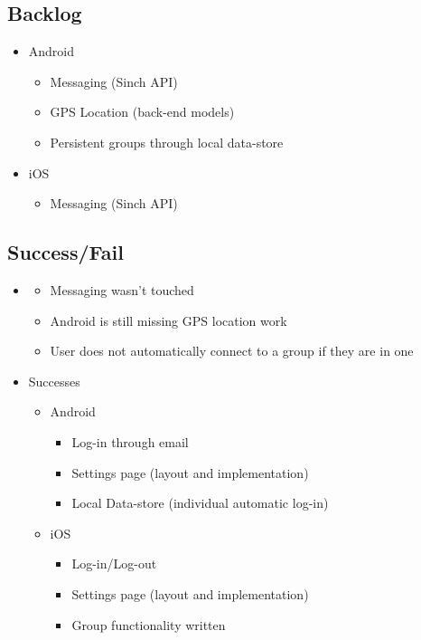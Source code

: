 \subsection{Backlog}
\begin{itemize}
	\item Android
	\begin{itemize}
		\item Messaging (Sinch API)
		\item GPS Location (back-end models)
		\item Persistent groups through local data-store
	\end{itemize}
	\item iOS
	\begin{itemize}
		\item Messaging (Sinch API)
	\end{itemize}
\end{itemize}
\subsection{Success/Fail}
\begin{itemize}
	\item 
	\begin{itemize}
		\item Messaging wasn't touched
		\item Android is still missing GPS location work
		\item User does not automatically connect to a group if they are in one
	\end{itemize}
	\item Successes
	\begin{itemize}
		\item Android
		\begin{itemize}
			\item Log-in through email
			\item Settings page (layout and implementation)
			\item Local Data-store (individual automatic log-in)
		\end{itemize}
		\item iOS
		\begin{itemize}
			\item Log-in/Log-out
			\item Settings page (layout and implementation)
			\item Group functionality written
		\end{itemize}
	\end{itemize}
\end{itemize}

